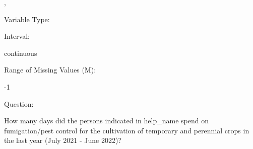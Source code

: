 \documentclass[
]{article}
\begin{document}
,

\begin{minipage}[t]{0.3\linewidth}

\colorbox{mypink1}{}

\end{minipage}%
\begin{minipage}[t]{0.7\linewidth}

\colorbox{mypink1}{\makebox[\textwidth]{\strut\bfseries\color{black}  
 }}

\end{minipage}

\begin{minipage}[t]{0.3\linewidth}

Variable Type:

\end{minipage}%
\begin{minipage}[t]{0.7\linewidth}

\end{minipage}

\begin{minipage}[t]{0.3\linewidth}

Interval:

\end{minipage}%
\begin{minipage}[t]{0.7\linewidth}

continuous

\end{minipage}

\begin{minipage}[t]{0.3\linewidth}

Range of Missing Values (M):

\end{minipage}%
\begin{minipage}[t]{0.7\linewidth}

-1

\end{minipage}

\begin{minipage}[t]{0.3\linewidth}

Question:

\end{minipage}%
\begin{minipage}[t]{0.7\linewidth}

How many days did the persons indicated in help\_name spend on
fumigation/pest control for the cultivation of temporary and perennial
crops in the last year (July 2021 - June 2022)?

\end{minipage}
\end{document}
